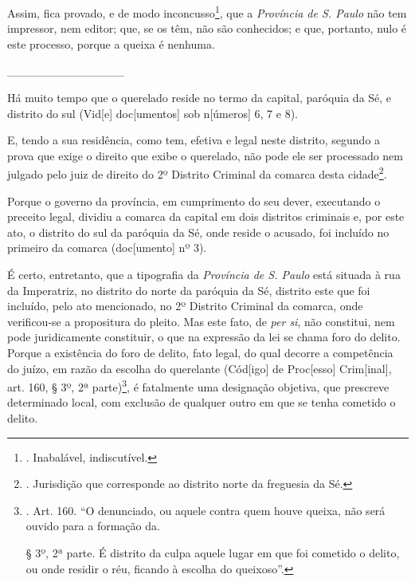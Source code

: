 Assim, fica provado, e de modo inconcusso\footnote{. Inabalável,
  indiscutível.}, que a \emph{Província de S. Paulo} não tem impressor,
nem editor; que, se os têm, não são conhecidos; e que, portanto, nulo é
este processo, porque a queixa é nenhuma.

\_\_\_\_\_\_\_\_\_\_\_\_\_\_

Há muito tempo que o querelado reside no termo da capital, paróquia da
Sé, e distrito do sul (Vid{[}e{]} doc{[}umentos{]} sob n{[}úmeros{]} 6,
7 e 8).

E, tendo a sua residência, como tem, efetiva e legal neste distrito,
segundo a prova que exige o direito que exibe o querelado, não pode ele
ser processado nem julgado pelo juiz de direito do 2º Distrito Criminal
da comarca desta cidade\footnote{. Jurisdição que corresponde ao
  distrito norte da freguesia da Sé.}.

Porque o governo da província, em cumprimento do seu dever, executando o
preceito legal, dividiu a comarca da capital em dois distritos criminais
e, por este ato, o distrito do sul da paróquia da Sé, onde reside o
acusado, foi incluído no primeiro da comarca (doc{[}umento{]} nº 3).

É certo, entretanto, que a tipografia da \emph{Província de S. Paulo}
está situada à rua da Imperatriz, no distrito do norte da paróquia da
Sé, distrito este que foi incluído, pelo ato mencionado, no 2º Distrito
Criminal da comarca, onde verificou-se a propositura do pleito. Mas este
fato, de \emph{per si}, não constitui, nem pode juridicamente
constituir, o que na expressão da lei se chama foro do delito. Porque a
existência do foro de delito, fato legal, do qual decorre a competência
do juízo, em razão da escolha do querelante (Cód{[}igo{]} de
Proc{[}esso{]} Crim{[}inal{]}, art. 160, § 3º, 2ª parte)\footnote{. Art.
  160. ``O denunciado, ou aquele contra quem houve queixa, não será
  ouvido para a formação da.

  § 3º, 2ª parte. É distrito da culpa aquele lugar em que foi cometido o
  delito, ou onde residir o réu, ficando à escolha do queixoso''.}, é
fatalmente uma designação objetiva, que prescreve determinado local, com
exclusão de qualquer outro em que se tenha cometido o delito.


